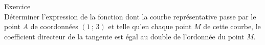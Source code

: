 \documentclass[a4paper,11pt,eval]{nsi}
\newcounter{exoNum}
\newcommand{\exo}[1]
{
	\addtocounter{exoNum}{1}
	{\titlefont\color{UGLiBlue}\Large Exercice\ \theexoNum\ \normalsize{#1}}\smallskip	
}
\begin{document}
\exo{}\\
Déterminer l'expression de la fonction dont la courbe représentative passe par le point $A$ de coordonnées $(1\,;\,3)$ et telle qu'en chaque point $M$ de cette courbe, le coefficient directeur de la tangente est égal au double de l'ordonnée du point $M$.\\

\\
\end{document}
